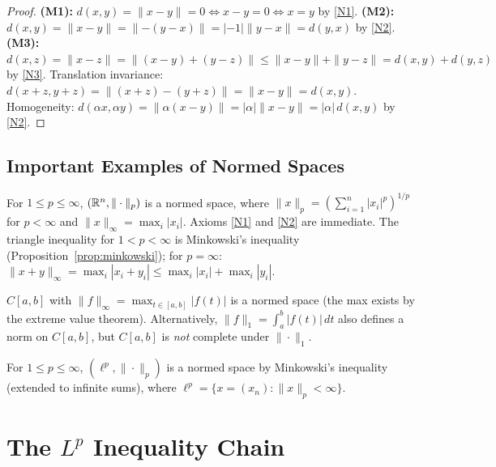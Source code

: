 \documentclass[11pt,a4paper]{article}
\begin{document}
\begin{proof}
\textbf{(M1):} $d(x,y) = \|x - y\| = 0 \iff x - y = 0 \iff x = y$ by
\ref{N1}.
\textbf{(M2):} $d(x,y) = \|x - y\| = \|{-(y-x)}\| = |{-1}|\|y-x\| =
d(y,x)$ by \ref{N2}.
\textbf{(M3):} $d(x,z) = \|x-z\| = \|(x-y)+(y-z)\| \le \|x-y\|+\|y-z\| =
d(x,y)+d(y,z)$ by \ref{N3}.
Translation invariance: $d(x+z,y+z) = \|(x+z)-(y+z)\| = \|x-y\| = d(x,y)$.
Homogeneity: $d(\alpha x,\alpha y) = \|\alpha(x-y)\| = |\alpha|\|x-y\| =
|\alpha|\,d(x,y)$ by \ref{N2}.
\end{proof}

\subsection{Important Examples of Normed Spaces}
\label{subsec:norm_examples}

\begin{example}
\label{ex:Rn_norms}
For $1 \le p \le \infty$, $(\mathbb{R}^n, \|\cdot\|_p)$ is a normed space, where
$\|x\|_p = (\sum_{i=1}^n |x_i|^p)^{1/p}$ for $p < \infty$ and
$\|x\|_\infty = \max_i |x_i|$. Axioms \ref{N1} and \ref{N2} are immediate.
The triangle inequality for $1 < p < \infty$ is Minkowski's inequality
(Proposition~\ref{prop:minkowski}); for $p = \infty$:
$\|x+y\|_\infty = \max_i |x_i+y_i| \le \max_i|x_i| + \max_i|y_i|$.
\end{example}

\begin{example}
\label{ex:Cab}
$C[a,b]$ with $\|f\|_\infty = \max_{t \in [a,b]} |f(t)|$ is a normed space
(the max exists by the extreme value theorem). Alternatively,
$\|f\|_1 = \int_a^b |f(t)|\, dt$ also defines a norm on $C[a,b]$, but
$C[a,b]$ is \emph{not} complete under $\|\cdot\|_1$.
\end{example}

\begin{example}
\label{ex:ell_p}
For $1 \le p \le \infty$, $(\ell^p, \|\cdot\|_p)$ is a normed space by
Minkowski's inequality (extended to infinite sums), where
$\ell^p = \{x = (x_n) : \|x\|_p < \infty\}$.
\end{example}


\section{The $L^p$ Inequality Chain}
\label{sec:lp_ineq}
\end{document}
